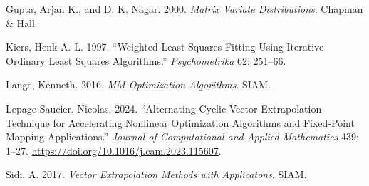 \documentclass[
  12pt,
  letterpaper,
  DIV=11,
  numbers=noendperiod]{scrartcl}
\newlength{\cslhangindent}
\newenvironment{CSLReferences}[2] %
 {\begin{list}{}{%
  \setlength{\itemindent}{0pt}
  \setlength{\leftmargin}{0pt}
  \setlength{\parsep}{0pt}
  \ifodd #1
   \setlength{\leftmargin}{\cslhangindent}
   \setlength{\itemindent}{-1\cslhangindent}
  \fi
  \setlength{\itemsep}{#2\baselineskip}}}
 {\end{list}}
\begin{document}
\begin{CSLReferences}{1}{1}
Gupta, Arjan K., and D. K. Nagar. 2000. \emph{Matrix Variate
Distributions}. {Chapman \& Hall}.

Kiers, Henk A. L. 1997. {``{Weighted Least Squares Fitting Using
Iterative Ordinary Least Squares Algorithms}.''} \emph{Psychometrika}
62: 251--66.

Lange, Kenneth. 2016. \emph{MM Optimization Algorithms}. SIAM.

Lepage-Saucier, Nicolas. 2024. {``Alternating Cyclic Vector
Extrapolation Technique for Accelerating Nonlinear Optimization
Algorithms and Fixed-Point Mapping Applications.''} \emph{Journal of
Computational and Applied Mathematics} 439: 1--27.
\url{https://doi.org/10.1016/j.cam.2023.115607}.

Sidi, A. 2017. \emph{Vector Extrapolation Methods with Applicatons}.
SIAM.

\end{CSLReferences}
\end{document}
